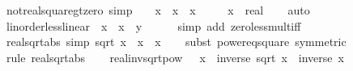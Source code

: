 \begin{isabellebody}
\isanewline
{}\isamarkupfalse%
\ not{\isacharunderscore}{\kern0pt}real{\isacharunderscore}{\kern0pt}square{\isacharunderscore}{\kern0pt}gt{\isacharunderscore}{\kern0pt}zero\ {\isacharbrackleft}{\kern0pt}simp{\isacharbrackright}{\kern0pt}{\isacharcolon}{\kern0pt}\ {\isachardoublequoteopen}{\isasymnot}\ {}\ {\isacharless}{\kern0pt}\ x\ {\isacharasterisk}{\kern0pt}\ x\ {\isasymlongleftrightarrow}\ x\ {\isacharequal}{\kern0pt}\ {}{\isachardoublequoteclose}\isanewline
\ \ \ x\ {\isacharcolon}{\kern0pt}{\isacharcolon}{\kern0pt}\ real\isanewline
%
\isadelimproof
\ \ %
\endisadelimproof
%
\isatagproof
{}\isamarkupfalse%
\ auto\isanewline
\ \ \isamarkupfalse%
\ linorder{\isacharunderscore}{\kern0pt}less{\isacharunderscore}{\kern0pt}linear\ {\isacharbrackleft}{\kern0pt}\ x\ {\isacharequal}{\kern0pt}\ x\ \ y\ {\isacharequal}{\kern0pt}\ {}{\isacharbrackright}{\kern0pt}\isanewline
\ \ \isamarkupfalse%
\ {\isacharparenleft}{\kern0pt}simp\ add{\isacharcolon}{\kern0pt}\ zero{\isacharunderscore}{\kern0pt}less{\isacharunderscore}{\kern0pt}mult{\isacharunderscore}{\kern0pt}iff{\isacharparenright}{\kern0pt}\isanewline
\ \ \isamarkupfalse%
%
\endisatagproof
{\isafoldproof}%
%
\isadelimproof
\isanewline
%
\endisadelimproof
\isanewline
{}\isamarkupfalse%
\ real{\isacharunderscore}{\kern0pt}sqrt{\isacharunderscore}{\kern0pt}abs{}\ {\isacharbrackleft}{\kern0pt}simp{\isacharbrackright}{\kern0pt}{\isacharcolon}{\kern0pt}\ {\isachardoublequoteopen}sqrt\ {\isacharparenleft}{\kern0pt}x\ {\isacharasterisk}{\kern0pt}\ x{\isacharparenright}{\kern0pt}\ {\isacharequal}{\kern0pt}\ {\isasymbar}x{\isasymbar}{\isachardoublequoteclose}\isanewline
%
\isadelimproof
\ \ %
\endisadelimproof
%
\isatagproof
{}\isamarkupfalse%
\ {\isacharparenleft}{\kern0pt}subst\ power{}{\isacharunderscore}{\kern0pt}eq{\isacharunderscore}{\kern0pt}square\ {\isacharbrackleft}{\kern0pt}symmetric{\isacharbrackright}{\kern0pt}{\isacharparenright}{\kern0pt}\isanewline
\ \ \isamarkupfalse%
\ {\isacharparenleft}{\kern0pt}rule\ real{\isacharunderscore}{\kern0pt}sqrt{\isacharunderscore}{\kern0pt}abs{\isacharparenright}{\kern0pt}\isanewline
\ \ \isamarkupfalse%
%
\endisatagproof
{\isafoldproof}%
%
\isadelimproof
\isanewline
%
\endisadelimproof
\isanewline
{}\isamarkupfalse%
\ real{\isacharunderscore}{\kern0pt}inv{\isacharunderscore}{\kern0pt}sqrt{\isacharunderscore}{\kern0pt}pow{}{\isacharcolon}{\kern0pt}\ {\isachardoublequoteopen}{}\ {\isacharless}{\kern0pt}\ x\ {\isasymLongrightarrow}\ {\isacharparenleft}{\kern0pt}inverse\ {\isacharparenleft}{\kern0pt}sqrt\ x{\isacharparenright}{\kern0pt}{\isacharparenright}{\kern0pt}\ {\isacharequal}{\kern0pt}\ inverse\ x{\isachardoublequoteclose}\isanewline

\end{isabellebody}

